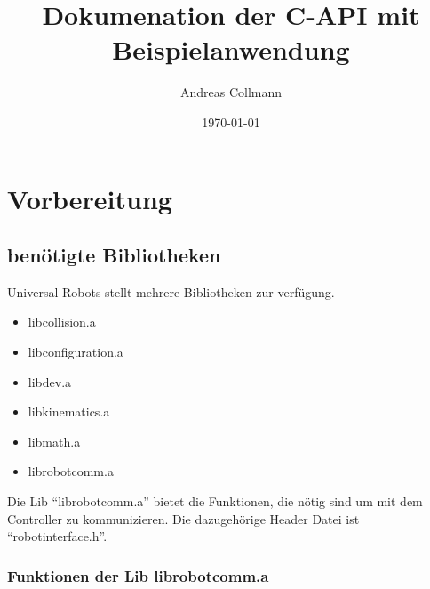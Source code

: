 \documentclass[
a4paper,
12pt,
oneside,
headsepline,		%
footsepline,		%
]{scrbook}
\title{Dokumenation der C-API mit Beispielanwendung}
\author{Andreas Collmann}
\date{\today}
\begin{document}
\tableofcontents

\chapter{Vorbereitung}
\label{vorbereitung}

\section{benötigte Bibliotheken}
\label{software_bibs}

Universal Robots stellt mehrere Bibliotheken zur verfügung. 

\begin{itemize}
\item libcollision.a
\item libconfiguration.a
\item libdev.a
\item libkinematics.a
\item libmath.a
\item librobotcomm.a
\end{itemize}

Die Lib ``librobotcomm.a'' bietet die Funktionen, die nötig sind um mit dem Controller zu kommunizieren. Die dazugehörige Header Datei ist 
``robotinterface.h''.

\subsection{Funktionen der Lib librobotcomm.a}
\label{sub: librobotcomm.a}
\end{document}
